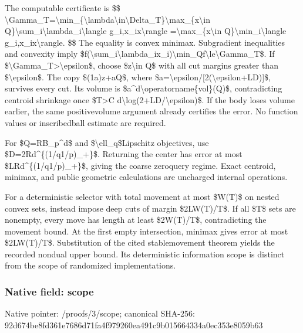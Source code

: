 \documentclass[10pt,a4paper]{article}
\begin{document}
The computable certificate is
\$\$
\textbackslash{}Gamma\_T=\textbackslash{}min\_\{\textbackslash{}lambda\textbackslash{}i\allowbreak{}n\textbackslash{}Delta\_T\}\textbackslash{}max\_\{x\textbackslash{}in Q\}\textbackslash{}sum\_i\textbackslash{}lambda\_i\textbackslash{}langle g\_i,x\_ix\textbackslash{}rangle
=\textbackslash{}max\_\{x\textbackslash{}in Q\}\textbackslash{}min\_i\textbackslash{}langle g\_i,x\_ix\textbackslash{}rangle.
\$\$
The equality is convex minimax. Subgradient inequalities and convexity imply
\$f(\textbackslash{}sum\_i\textbackslash{}lambda\_ix\_i)\textbackslash{}\allowbreak{}min\_Qf\textbackslash{}le\textbackslash{}Gamma\_T\$.
If \$\textbackslash{}Gamma\_T>\textbackslash{}epsilon\$, choose \$z\textbackslash{}in Q\$ with all cut margins greater than \$\textbackslash{}epsilon\$. The copy \$(1a)z+aQ\$, where \$a=\textbackslash{}epsilon/[2(\textbackslash{}epsilon+LD)]\$, survives every cut. Its volume is \$a\textasciicircum{}d\textbackslash{}operatorname\{vol\}(Q)\$, contradicting centroid shrinkage once \$T>C d\textbackslash{}log(2+LD/\textbackslash{}epsilon)\$. If the body loses volume earlier, the same positivevolume argument already certifies the error. No function values or inscribedball estimate are required.

For \$Q=RB\_p\textasciicircum{}d\$ and \$\textbackslash{}ell\_q\$Lipschitz objectives, use \$D=2Rd\textasciicircum{}\{(1/q1/p)\_+\}\$. Returning the center has error at most \$LRd\textasciicircum{}\{(1/q1/p)\_+\}\$, giving the coarse zeroquery regime. Exact centroid, minimax, and public geometric calculations are uncharged internal operations.

For a deterministic selector with total movement at most \$W(T)\$ on nested convex sets, instead impose deep cuts of margin \$2LW(T)/T\$. If all \$T\$ sets are nonempty, every move has length at least \$2W(T)/T\$, contradicting the movement bound. At the first empty intersection, minimax gives error at most \$2LW(T)/T\$. Substitution of the cited stablemovement theorem yields the recorded nondual upper bound. Its deterministic information scope is distinct from the scope of randomized implementations.


\subsubsection{Native field: scope}


Native pointer: /proofs/3/scope; canonical SHA-256: 92d674be8fd361e7686d71fa\allowbreak{}4f979260ea491c9b01566433\allowbreak{}4a0ec353e8059b63
\end{document}
